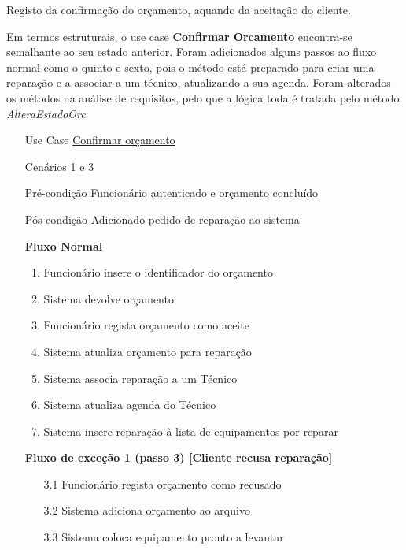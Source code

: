 \documentclass[../relatorio.tex]{subfiles}
\begin{document}
Registo da confirmação do orçamento, aquando da aceitação do cliente.

Em termos estruturais, o use case \textbf{Confirmar Orcamento} encontra-se semalhante ao seu estado anterior.
Foram adicionados alguns passos ao fluxo normal como o quinto e sexto, pois o método está preparado para 
criar uma reparação e a associar a um técnico, atualizando a sua agenda.
Foram alterados os métodos na análise de requisitos, pelo que a lógica toda é tratada pelo método \textit{AlteraEstadoOrc}.
\begin{itemize}
    \item[Use Case] {\underline{Confirmar orçamento}}
    \item[Cenários] {1 e 3}
    \item[Pré-condição] {Funcionário autenticado e orçamento concluído}
    \item[Pós-condição] {Adicionado pedido de reparação ao sistema}
          \begin{flushleft}
              \textbf{Fluxo Normal}
          \end{flushleft}
          \begin{enumerate}
              \item Funcionário insere o identificador do orçamento 
              \item Sistema devolve orçamento
              \item Funcionário regista orçamento como aceite
              \item Sistema atualiza orçamento para reparação 
              \item Sistema associa reparação a um Técnico 
              \item Sistema atualiza agenda do Técnico
              \item Sistema insere reparação à lista de equipamentos por reparar
          \end{enumerate}
          \begin{flushleft}
              \textbf{Fluxo de exceção 1 (passo 3) [Cliente recusa reparação]}
          \end{flushleft}
          \begin{itemize}
              \item[3.1]{Funcionário regista orçamento como recusado}
              \item[3.2]{Sistema adiciona orçamento ao arquivo}
              \item[3.3]{Sistema coloca equipamento pronto a levantar}
          \end{itemize}
\end{itemize}
\end{document}
